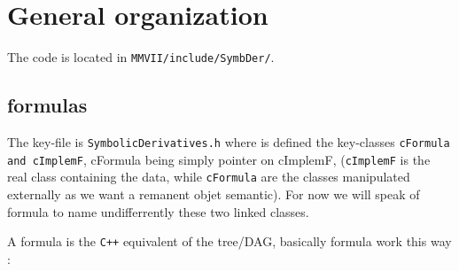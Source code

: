 \section{General organization}


The code is located in  {\tt MMVII/include/SymbDer/}.

\subsection{formulas}

The key-file is {\tt SymbolicDerivatives.h}  where is defined   the key-classes   {\tt cFormula and cImplemF},
cFormula being simply pointer on cImplemF,  ({\tt cImplemF} is the real class containing the data, while
{\tt cFormula} are the classes manipulated externally as we want a remanent objet  semantic).
For now we will speak of formula to name undifferrently these two linked classes.


A formula is the {\tt C++} equivalent of the tree/DAG, basically formula work this way :

